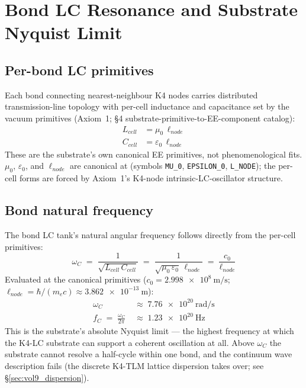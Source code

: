 \section{Bond LC Resonance and Substrate Nyquist Limit}
\label{sec:vol9_omega_c}

\subsection{Per-bond LC primitives}

Each bond connecting nearest-neighbour K4 nodes carries distributed transmission-line topology with per-cell inductance and capacitance set by the vacuum primitives (Axiom~1;  \S 4 substrate-primitive-to-EE-component catalog):
\begin{align}
L_{cell} &= \mu_0\, \ell_{node} \\
C_{cell} &= \varepsilon_0\, \ell_{node}
\end{align}
These are the substrate's own canonical EE primitives, not phenomenological fits. $\mu_0$, $\varepsilon_0$, and $\ell_{node}$ are canonical at  (symbols \texttt{MU\_0}, \texttt{EPSILON\_0}, \texttt{L\_NODE}); the per-cell forms are forced by Axiom~1's K4-node intrinsic-LC-oscillator structure.

\subsection{Bond natural frequency}

The bond LC tank's natural angular frequency follows directly from the per-cell primitives:
\begin{equation}
\omega_C \;=\; \frac{1}{\sqrt{L_{cell}\, C_{cell}}} \;=\; \frac{1}{\sqrt{\mu_0\, \varepsilon_0}\, \ell_{node}} \;=\; \frac{c_0}{\ell_{node}}
\end{equation}
Evaluated at the canonical primitives ($c_0 = \qty{2.998e8}{\metre\per\second}$; $\ell_{node} = \hbar/(m_e c) \approx \qty{3.862e-13}{\metre}$):
\begin{align}
\omega_C &\;\approx\; \qty{7.76e20}{\radian\per\second} \\
f_C \;=\; \frac{\omega_C}{2\pi} &\;\approx\; \qty{1.23e20}{\hertz}
\end{align}
This is the substrate's absolute Nyquist limit --- the highest frequency at which the K4-LC substrate can support a coherent oscillation at all. Above $\omega_C$ the substrate cannot resolve a half-cycle within one bond, and the continuum wave description fails (the discrete K4-TLM lattice dispersion takes over; see \S\ref{sec:vol9_dispersion}).

